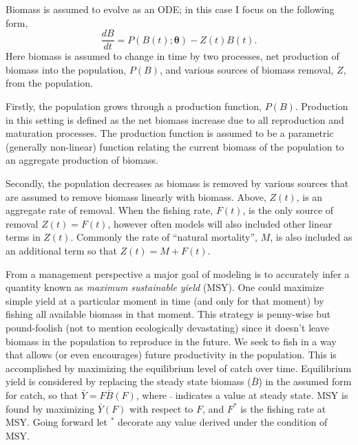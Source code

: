 \documentclass[12pt]{article}
\begin{document}
% 
Biomass is assumed to evolve as an ODE; in this case I focus on the following
form,
%
\begin{equation}
\frac{dB}{dt} = P(B(t); \bm{\theta}) - Z(t)B(t). \label{ode}
\end{equation}
Here biomass is assumed to change in time by two processes, net production of
biomass into the population, $P(B)$, and various sources of biomass removal, $Z$, from the 
population. 

Firstly, the population grows through a production function, $P(B)$. Production
in this setting is defined as the net biomass increase due to all reproduction
and maturation processes.
The production function is assumed to be a parametric (generally non-linear) function 
relating the current biomass of the population to an aggregate production 
of biomass.

%
Secondly, the population decreases as biomass is removed by various sources that are 
assumed to remove biomass linearly with biomass. Above, $Z(t)$, is an 
aggregate rate of removal. When the fishing rate, $F(t)$, is the only source of removal 
$Z(t)=F(t)$, however often models will also included other linear terms in $Z(t)$. 
Commonly the rate of ``natural mortality'', $M$, is also included as an additional term 
so that $Z(t)=M+F(t)$.

From a management perspective a major goal of modeling is to accurately infer
a quantity known as \emph{maximum sustainable yield} (MSY). One could maximize
simple yield at a particular moment in time (and only for that moment) by
fishing all available biomass in that moment. This strategy is penny-wise but
pound-foolish (not to mention ecologically devastating) since it doesn't leave
biomass in the population to reproduce in the future. We seek to fish in a way 
that allows (or even encourages) future productivity in the population. This is 
accomplished by maximizing the equilibrium level of catch over time. 
Equilibrium yield is considered by replacing the steady state biomass ($\bar B$) 
in the assumed form for catch, so that $\bar Y = F\bar B(F)$, where $\bar~$ 
indicates a value at steady state.  
MSY is found by maximizing $\bar Y(F)$ with respect to
$F$, and $F^*$ is the fishing rate at MSY. Going forward let $^*$ decorate any
value derived under the condition of MSY.
\end{document}
